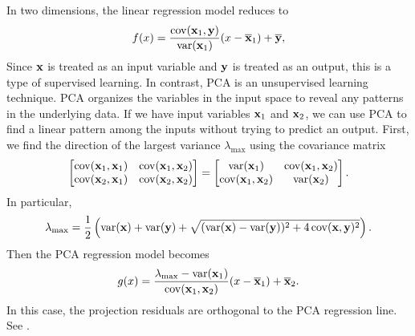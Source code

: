 In two dimensions, the linear regression model reduces to
\begin{equation}
    \label{eqn:ols-model}
    f(x) = \frac{\operatorname{cov}(\mathbf{x}_1,\mathbf{y})}{\operatorname{var}(\mathbf{x}_1)}(x - \overline{\mathbf{x}}_1) + \overline{\mathbf{y}},
\end{equation}
Since \(\mathbf{x}\) is treated as an input variable and \(\mathbf{y}\) is treated as an output, this is a type of supervised learning.
In contrast, PCA is an unsupervised learning technique.
PCA organizes the variables in the input space to reveal any patterns in the underlying data.
If we have input variables \(\mathbf{x}_1\) and \(\mathbf{x}_2\), we can use PCA to find a linear pattern among the inputs without trying to predict an output.
First, we find the direction of the largest variance \(\lambda_{\max}\) using the covariance matrix
\[\begin{bmatrix}
    \operatorname{cov}(\mathbf{x}_1, \mathbf{x}_1) & \operatorname{cov}(\mathbf{x}_1, \mathbf{x}_2) \\
    \operatorname{cov}(\mathbf{x}_2, \mathbf{x}_1) & \operatorname{cov}(\mathbf{x}_2, \mathbf{x}_2)
\end{bmatrix} = \begin{bmatrix}
    \operatorname{var}(\mathbf{x}_1) & \operatorname{cov}(\mathbf{x}_1, \mathbf{x}_2) \\
    \operatorname{cov}(\mathbf{x}_1, \mathbf{x}_2) & \operatorname{var}(\mathbf{x}_2)
\end{bmatrix}.\]
In particular,
\[\lambda_{\max} = \frac{1}{2}\left(\operatorname{var}(\mathbf{x}) + \operatorname{var}(\mathbf{y}) + \sqrt{(\operatorname{var}(\mathbf{x}) - \operatorname{var}(\mathbf{y}))^2 + 4\operatorname{cov}(\mathbf{x},\mathbf{y})^2}\right).\]
Then the PCA regression model becomes
\begin{equation}
    \label{eqn:pca-model}
    g(x) = \frac{\lambda_{\max} - \operatorname{var}({\mathbf{x}_1})}{\operatorname{cov}(\mathbf{x}_1,\mathbf{x}_2)}(x - \overline{\mathbf{x}}_1) + \overline{\mathbf{x}}_2.
\end{equation}
In this case, the projection residuals are orthogonal to the PCA regression line.
See .

